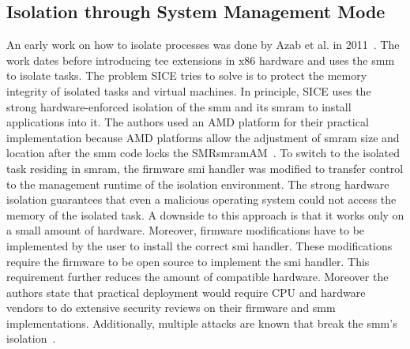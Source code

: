 \subsection{Isolation through System Management Mode}
\label{sec:20:isolation_smm}
An early work on how to isolate processes was done by Azab et al. in
2011~\cite{azab_sice_2011}. The work dates before introducing \gls{tee}
extensions in x86 hardware and uses the \gls{smm} to isolate tasks. The problem
SICE tries to solve is to protect the memory integrity of isolated tasks and
virtual machines. In principle, SICE uses the strong hardware-enforced isolation
of the \gls{smm} and its \gls{smram} to install applications into it. The
authors used an AMD platform for their practical implementation because AMD
platforms allow the adjustment of \gls{smram} size and location after the
\gls{smm} code locks the SMR\gls{smram}AM~\cite{bios2014amd}. To switch to the
isolated task residing in \gls{smram}, the firmware \gls{smi} handler was
modified to transfer control to the management runtime of the isolation
environment. The strong hardware isolation guarantees that even a malicious
operating system could not access the memory of the isolated task. A downside to
this approach is that it works only on a small amount of hardware. Moreover,
firmware modifications have to be implemented by the user to install the correct
\gls{smi} handler. These modifications require the firmware to be open source to
implement the \gls{smi} handler. This requirement further reduces the amount of
compatible hardware. Moreover the authors state that practical deployment would
require CPU and hardware vendors to do extensive security reviews on their
firmware and \gls{smm} implementations. Additionally, multiple attacks are known
that break the \gls{smm}'s isolation~\cite{wojtczuk2014attacking,
wojtczuk2009attacking, wojtczuk2009poisining}.

